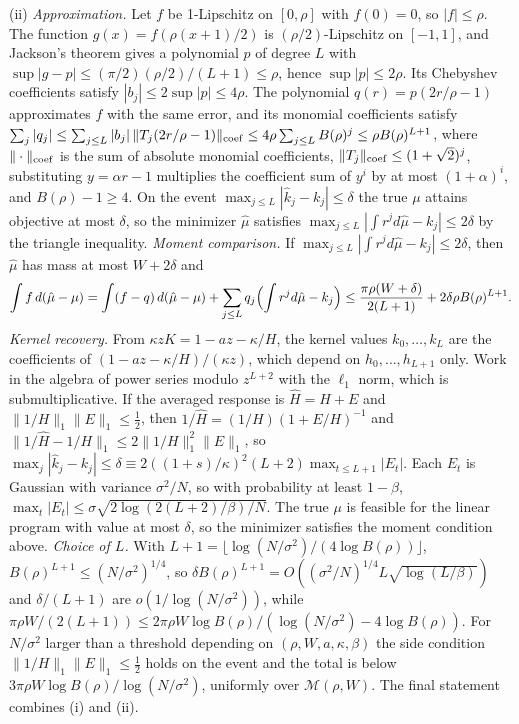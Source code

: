 (ii) \emph{Approximation.} Let $f$ be 1-Lipschitz on $[0,\rho]$ with $f(0)=0$, so $|f|\le\rho$. The function $g(x)=f(\rho(x+1)/2)$ is $(\rho/2)$-Lipschitz on $[-1,1]$, and Jackson's theorem \citep{rivlin1981} gives a polynomial $p$ of degree $L$ with $\sup|g-p|\le(\pi/2)(\rho/2)/(L+1)\le\rho$, hence $\sup|p|\le2\rho$. Its Chebyshev coefficients satisfy $|b_j|\le2\sup|p|\le4\rho$. The polynomial $q(r)=p(2r/\rho-1)$ approximates $f$ with the same error, and its monomial coefficients satisfy $\sum_j|q_j|\le\sum_{j\le L}|b_j|\,\|T_j(2r/\rho-1)\|_{\rm coef}\le4\rho\sum_{j\le L}B(\rho)^j\le\rho B(\rho)^{L+1}$, where $\|\cdot\|_{\rm coef}$ is the sum of absolute monomial coefficients, $\|T_j\|_{\rm coef}\le(1+\sqrt2)^j$, substituting $y=\alpha r-1$ multiplies the coefficient sum of $y^i$ by at most $(1+\alpha)^i$, and $B(\rho)-1\ge4$. On the event $\max_{j\le L}|\hat k_j-k_j|\le\delta$ the true $\mu$ attains objective at most $\delta$, so the minimizer $\hat\mu$ satisfies $\max_{j\le L}|\int r^jd\hat\mu-k_j|\le2\delta$ by the triangle inequality. \emph{Moment comparison.} If $\max_{j\le L}|\int r^jd\hat\mu-k_j|\le2\delta$, then $\hat\mu$ has mass at most $W+2\delta$ and
\[
\int f\,d(\hat\mu-\mu)=\int(f-q)\,d(\hat\mu-\mu)+\sum_{j\le L}q_j\Bigl(\int r^jd\hat\mu-k_j\Bigr)\le\frac{\pi\rho(W+\delta)}{2(L+1)}+2\delta\rho B(\rho)^{L+1}.
\]
\emph{Kernel recovery.} From $\kappa zK=1-az-\kappa/H$, the kernel values $k_0,\ldots,k_L$ are the coefficients of $(1-az-\kappa/H)/(\kappa z)$, which depend on $h_0,\ldots,h_{L+1}$ only. Work in the algebra of power series modulo $z^{L+2}$ with the $\ell_1$ norm, which is submultiplicative. If the averaged response is $\hat H=H+E$ and $\|1/H\|_1\|E\|_1\le\tfrac12$, then $1/\hat H=(1/H)(1+E/H)^{-1}$ and $\|1/\hat H-1/H\|_1\le2\|1/H\|_1^2\|E\|_1$, so $\max_j|\hat k_j-k_j|\le\delta\equiv2((1+s)/\kappa)^2(L+2)\max_{t\le L+1}|E_t|$. Each $E_t$ is Gaussian with variance $\sigma^2/N$, so with probability at least $1-\beta$, $\max_t|E_t|\le\sigma\sqrt{2\log(2(L+2)/\beta)/N}$. The true $\mu$ is feasible for the linear program with value at most $\delta$, so the minimizer satisfies the moment condition above. \emph{Choice of $L$.} With $L+1=\lfloor\log(N/\sigma^2)/(4\log B(\rho))\rfloor$, $B(\rho)^{L+1}\le(N/\sigma^2)^{1/4}$, so $\delta B(\rho)^{L+1}=O((\sigma^2/N)^{1/4}L\sqrt{\log(L/\beta)})$ and $\delta/(L+1)$ are $o(1/\log(N/\sigma^2))$, while $\pi\rho W/(2(L+1))\le2\pi\rho W\log B(\rho)/(\log(N/\sigma^2)-4\log B(\rho))$. For $N/\sigma^2$ larger than a threshold depending on $(\rho,W,a,\kappa,\beta)$ the side condition $\|1/H\|_1\|E\|_1\le\frac12$ holds on the event and the total is below $3\pi\rho W\log B(\rho)/\log(N/\sigma^2)$, uniformly over $\mathcal M(\rho,W)$. The final statement combines (i) and (ii).

